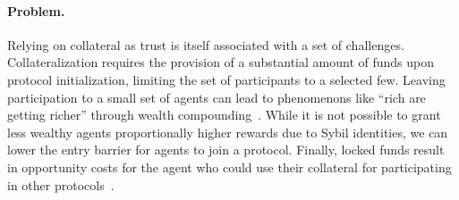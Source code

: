\documentclass[runningheads]{llncs}
\newcommand{\aza}[1]{\todo[linecolor=blue,backgroundcolor=blue!25,bordercolor=blue,inline,caption={}]{Comment by Alexei: #1}}
\begin{document}
\paragraph{Problem.}
Relying on collateral as trust is itself associated with a set of challenges. 
Collateralization requires the provision of a substantial amount of funds upon protocol initialization, limiting the set of participants to a selected few.
Leaving participation to a small set of agents can lead to phenomenons like ``rich are getting richer'' through wealth compounding~\cite{Fanti2019Compounding}.
While it is not possible to grant less wealthy agents proportionally higher rewards due to Sybil identities, we can lower the entry barrier for agents to join a protocol.
Finally, locked funds result in opportunity costs for the agent who could use their collateral for participating in other protocols~\cite{Harz2019Balance}.


\end{document}
